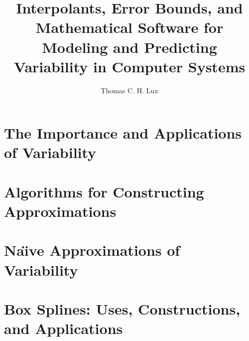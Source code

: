 \documentclass[singlespace,nopageskip]{VTthesis} %
\title{Interpolants, Error Bounds, and Mathematical Software for Modeling and Predicting Variability in Computer Systems}
\author{Thomas C. H. Lux}
\begin{document}
\frontmatter
\maketitle
\tableofcontents

\listoffigures
\listoftables


\mainmatter


\chapter{The Importance and Applications of Variability} \label{ch:apps}


\chapter{Algorithms for Constructing Approximations} \label{ch:algs}


\chapter{Na\"{\i}ve Approximations of Variability} \label{ch:naive}


\chapter{Box Splines: Uses, Constructions, and Applications} \label{ch:boxes}

\end{document}
